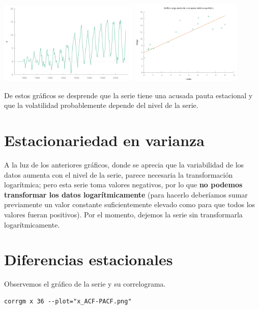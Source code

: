 \documentclass[10pt]{article}
\begin{document}
\begin{center}
\includegraphics[width=0.5\textwidth]{./SegundoEjercicioIdentificacionModeloARIMA/SerieEnNiveles.png}
\includegraphics[width=0.4\textwidth]{./SegundoEjercicioIdentificacionModeloARIMA/rango-media.png} 
\end{center}

De estos gráficos se desprende que la serie tiene una acusada pauta
estacional y que la volatilidad probablemente depende del nivel de la
serie.
\section*{Estacionariedad en varianza}
\label{sec:orgeb2946e}

A la luz de los anteriores gráficos, donde se aprecia que la
variabilidad de los datos aumenta con el nivel de la serie, parece
necesaria la transformación logarítmica; pero esta serie toma valores
negativos, por lo que \textbf{no podemos transformar los datos
logarítmicamente} (para hacerlo deberíamos sumar previamente un valor
constante suficientemente elevado como para que todos los valores
fueran positivos). Por el momento, dejemos la serie sin transformarla
logarítmicamente.
\section*{Diferencias estacionales}
\label{sec:orgecfb6ad}

Observemos el gráfico de la serie y su correlograma.

\begin{verbatim}
corrgm x 36 --plot="x_ACF-PACF.png"
\end{verbatim}
\end{document}
